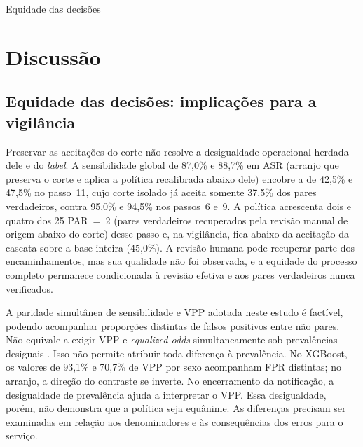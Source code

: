 \begin{chapter}{Equidade das decisões}





\section{Discussão}\label{sec:e5-discussao}

\subsection{Equidade das decisões: implicações para a vigilância}\label{sec:e5-discussao-equidade}

Preservar as aceitações do corte não resolve a desigualdade operacional herdada dele e do \textit{label}. A sensibilidade global de 87,0\% e 88,7\% em ASR (arranjo que preserva o corte e aplica a política recalibrada abaixo dele) encobre a de 42,5\% e 47,5\% no passo~11, cujo corte isolado já aceita somente 37,5\% dos pares verdadeiros, contra 95,0\% e 94,5\% nos passos~6 e~9. A política acrescenta dois e quatro dos 25 PAR~=~2 (pares verdadeiros recuperados pela revisão manual de origem abaixo do corte) desse passo e, na vigilância, fica abaixo da aceitação da cascata sobre a base inteira (45,0\%). A revisão humana pode recuperar parte dos encaminhamentos, mas sua qualidade não foi observada, e a equidade do processo completo permanece condicionada à revisão efetiva e aos pares verdadeiros nunca verificados.

A paridade simultânea de sensibilidade e VPP adotada neste estudo é factível, podendo acompanhar proporções distintas de falsos positivos entre não pares. Não equivale a exigir VPP e \textit{equalized odds} simultaneamente sob prevalências desiguais \cite{Kleinberg2016inherent,Chouldechova2017fair}. Isso não permite atribuir toda diferença à prevalência. No XGBoost, os valores de 93,1\% e 70,7\% de VPP por sexo acompanham FPR distintas; no arranjo, a direção do contraste se inverte. No encerramento da notificação, a desigualdade de prevalência ajuda a interpretar o VPP. Essa desigualdade, porém, não demonstra que a política seja equânime. As diferenças precisam ser examinadas em relação aos denominadores e às consequências dos erros para o serviço.


\end{chapter}
